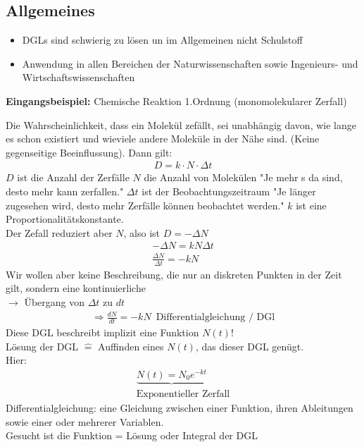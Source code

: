 \documentclass{article}
\begin{document}
\subsection{Allgemeines}
\begin{itemize}
    \item DGLs sind schwierig zu lösen un im Allgemeinen nicht Schulstoff
    \item Anwendung in allen Bereichen der Naturwissenschaften sowie Ingenieurs- und Wirtschaftswissenschaften
\end{itemize}
\textbf{Eingangsbeispiel:}
Chemische Reaktion 1.Ordnung (monomolekularer Zerfall)
\begin{center}
\end{center}
Die Wahrscheinlichkeit, dass ein Molekül  zefällt, sei unabhängig davon, wie lange es schon existiert und wieviele andere Moleküle  in der Nähe sind. (Keine gegenseitige Beeinflussung). Dann gilt:
\begin{eqnarray*}
    D = k\cdot N\cdot\Delta t
\end{eqnarray*}
$D$ ist die Anzahl der Zerfälle $N$ die Anzahl von  Molekülen "Je mehr s da sind, desto mehr kann zerfallen." $\Delta t$ ist der Beobachtungszeitraum "Je länger zugesehen wird, desto mehr Zerfälle können beobachtet werden." $k$ ist eine Proportionalitätskonstante.\\
Der Zefall reduziert aber $N$, also ist $D = -\Delta N$\\
\begin{eqnarray*}
    -\Delta N = kN\Delta t\\
    \frac{\Delta N}{\Delta t} = -kN
\end{eqnarray*}
Wir wollen aber keine Beschreibung, die nur an diskreten Punkten in der Zeit gilt, sondern eine kontinuierliche\\
$\rightarrow$ Übergang von $\Delta t$ zu $dt$
\begin{eqnarray*}
    \Rightarrow \frac{dN}{dt}=-kN\,\text{ Differentialgleichung / DGl}
\end{eqnarray*}
Diese DGL beschreibt implizit eine Funktion $N(t)$!\\
Lösung der DGL $\hat{=}$ Auffinden eines $N(t)$, das dieser DGL genügt.\\
Hier:
\begin{eqnarray*}
    \underbrace{N(t) = N_0e^{-kt}}\\
    \text{Exponentieller Zerfall}
\end{eqnarray*}
Differentialgleichung: eine Gleichung zwischen einer Funktion, ihren Ableitungen sowie einer oder mehrerer Variablen.\\
Gesucht ist die Funktion = Lösung oder Integral der DGL
\end{document}
